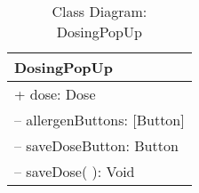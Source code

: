 \begin{table}[H]
\centering
\caption{Class Diagram: DosingPopUp}

\hspace{1em}
\renewcommand{\arraystretch}{1.7}

\begin{tabular}{|l|}
\hline
\textbf{DosingPopUp} \\
\hline
+ dose: Dose \\
– allergenButtons: [Button] \\
– saveDoseButton: Button \\
\hdashline
– saveDose( ): Void \\
\hline
\end{tabular}
\end{table}
